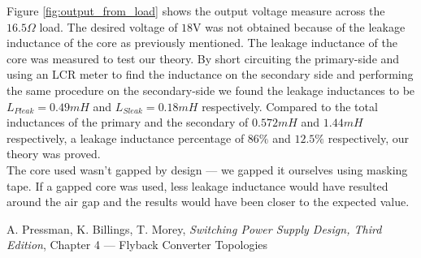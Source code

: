 \documentclass[a4paper, 12pt]{article}
\begin{document}
Figure \ref{fig:output_from_load} shows the output voltage measure across the $16.5\Omega$ load. The desired voltage of $18$V was not obtained because of the leakage inductance of the core as previously mentioned. The leakage inductance of the core was measured to test our theory. By short circuiting the primary-side and using an LCR meter to find the inductance on the secondary side and performing the same procedure on the secondary-side we found the leakage inductances to be $L_{Pleak} = 0.49mH$ and $L_{Sleak} = 0.18mH$ respectively. Compared to the total inductances of the primary and the secondary of $0.572mH$ and $1.44mH$ respectively, a leakage inductance percentage of $86\%$ and $12.5\%$ respectively, our theory was proved.\\

The core used wasn't gapped by design --- we gapped it ourselves using masking tape. If a gapped core was used, less leakage inductance would have resulted around the air gap and the results would have been closer to the expected value.  


\begin{thebibliography}{0}
	 A. Pressman, K. Billings, T. Morey, \textit{Switching Power Supply Design, Third Edition}, Chapter 4 --- Flyback Converter Topologies
\end{thebibliography}
\end{document}
